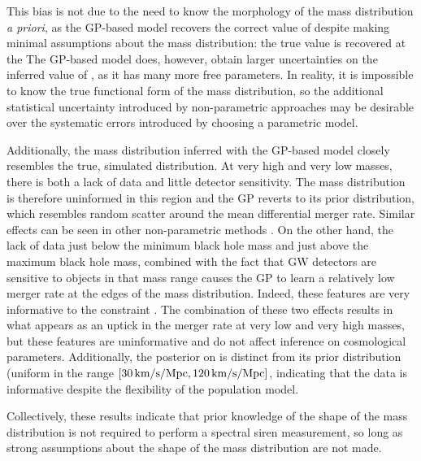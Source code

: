 \documentclass[]{aastex631}
\begin{document}
This bias is not due to the need to know the morphology of the mass distribution \emph{a priori}, as the \ac{GP}-based model recovers the correct value of \Ho{} despite making minimal assumptions about the mass distribution: the true value is recovered at the %
The \ac{GP}-based model does, however, obtain larger uncertainties on the inferred value of \Ho, as it has many more free parameters. 
In reality, it is impossible to know the true functional form of the mass distribution, so the additional statistical uncertainty introduced by non-parametric approaches may be desirable over the systematic errors introduced by choosing a parametric model.

Additionally, the mass distribution inferred with the \ac{GP}-based model closely resembles the true, simulated distribution.
At very high and very low masses, there is both a lack of data and little detector sensitivity.
The mass distribution is therefore uninformed in this region and the \ac{GP} reverts to its prior distribution, which resembles random scatter around the mean differential merger rate.
Similar effects can be seen in other non-parametric methods \citep{edelman_cover_2023, callister_parameter-free_2023}.
On the other hand, the lack of data just below the minimum black hole mass and just above the maximum black hole mass, combined with the fact that \ac{GW} detectors are sensitive to objects in that mass range causes the \ac{GP} to learn a relatively low merger rate at the edges of the mass distribution.
Indeed, these features are very informative to the \Ho{} constraint \citep{the_ligo_scientific_collaboration_constraints_2021}.
The combination of these two effects results in what appears as an uptick in the merger rate at very low and very high masses, but these features are uninformative and do not affect inference on cosmological parameters.
Additionally, the posterior on \Ho{} is distinct from its prior distribution (uniform in the range $[30\,\text{km/s/Mpc},120\,\text{km/s/Mpc}]$, indicating that the data is informative despite the flexibility of the population model.

Collectively, these results indicate that prior knowledge of the shape of the mass distribution is not required to perform a spectral siren measurement, so long as strong assumptions about the shape of the mass distribution are not made.
\end{document}
